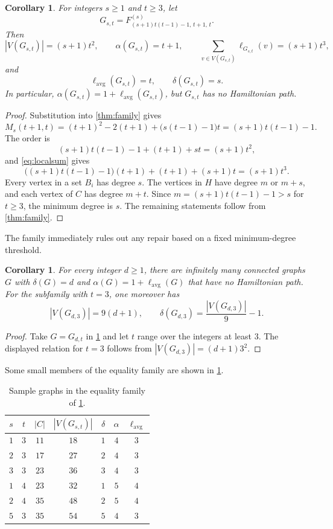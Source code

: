 \documentclass[11pt]{article}
\newtheorem{corollary}[theorem]{Corollary}
\newcommand{\lavg}{\ell_{\mathrm{avg}}}
\begin{document}
\begin{corollary}\label{cor:equality}
For integers $s\geq 1$ and $t\geq 3$, let
\[
  G_{s,t}=F^{(s)}_{(s+1)t(t-1)-1,\,t+1,\,t}.
\]
Then
\[
  |V(G_{s,t})|=(s+1)t^2,\qquad
  \alpha(G_{s,t})=t+1,\qquad
  \sum_{v\in V(G_{s,t})}\ell_{G_{s,t}}(v)=(s+1)t^3,
\]
and
\[
  \lavg(G_{s,t})=t,\qquad \delta(G_{s,t})=s.
\]
In particular, $\alpha(G_{s,t})=1+\lavg(G_{s,t})$, but $G_{s,t}$ has no
Hamiltonian path.
\end{corollary}

\begin{proof}
Substitution into \cref{thm:family} gives
\[
  M_s(t+1,t)
  =(t+1)^2-2(t+1)+\bigl(s(t-1)-1\bigr)t
  =(s+1)t(t-1)-1.
\]
The order is
\[
  (s+1)t(t-1)-1+(t+1)+st=(s+1)t^2,
\]
and \cref{eq:localsum} gives
\[
  \bigl((s+1)t(t-1)-1\bigr)(t+1)+(t+1)+(s+1)t
  =(s+1)t^3.
\]
Every vertex in a set $B_i$ has degree $s$.  The vertices in $H$ have degree $m$ or
$m+s$, and each vertex of $C$ has degree $m+t$.  Since
$m=(s+1)t(t-1)-1>s$ for $t\geq 3$, the minimum degree is $s$.  The remaining statements
follow from \cref{thm:family}.
\end{proof}

The family immediately rules out any repair based on a fixed minimum-degree threshold.

\begin{corollary}\label{cor:min-degree}
For every integer $d\geq 1$, there are infinitely many connected graphs $G$ with
$\delta(G)=d$ and $\alpha(G)=1+\lavg(G)$ that have no Hamiltonian path.
For the subfamily with $t=3$, one moreover has
\[
  |V(G_{d,3})|=9(d+1),\qquad \delta(G_{d,3})=\frac{|V(G_{d,3})|}{9}-1.
\]
\end{corollary}

\begin{proof}
Take $G=G_{d,t}$ in \cref{cor:equality} and let $t$ range over the integers at least $3$.
The displayed relation for $t=3$ follows from $|V(G_{d,3})|=(d+1)3^2$.
\end{proof}

Some small members of the equality family are shown in \cref{tab:first}.

\begin{table}[ht]
  \centering
  \begin{tabular}{@{}ccccccc@{}}
    \toprule
    $s$ & $t$ & $|C|$ & $|V(G_{s,t})|$ & $\delta$ & $\alpha$ & $\lavg$ \\
    \midrule
    $1$ & $3$ & $11$ & $18$ & $1$ & $4$ & $3$ \\
    $2$ & $3$ & $17$ & $27$ & $2$ & $4$ & $3$ \\
    $3$ & $3$ & $23$ & $36$ & $3$ & $4$ & $3$ \\
    $1$ & $4$ & $23$ & $32$ & $1$ & $5$ & $4$ \\
    $2$ & $4$ & $35$ & $48$ & $2$ & $5$ & $4$ \\
    $5$ & $3$ & $35$ & $54$ & $5$ & $4$ & $3$ \\
    \bottomrule
  \end{tabular}
  \caption{Sample graphs in the equality family of \cref{cor:equality}.}
  \label{tab:first}
\end{table}
\end{document}
